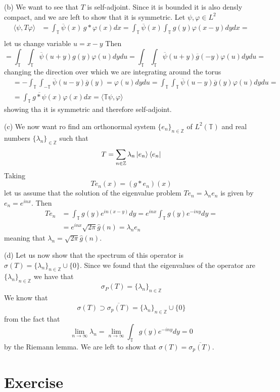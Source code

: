 \documentclass{article}
\newcommand{\T}{\mathbb{T}}
\newcommand{\Z}{\mathbb{Z}}
\begin{document}
(b) We want to see that $T$ is self-adjoint. Since it is bounded it is also densly compact, and we are left to show that it is symmetric. Let $\psi, \varphi \in L^2$
\[
    \begin{split}
        \langle \psi, T \varphi \rangle &= \int_\T \overline{\psi} (x)\, g*\varphi (x) dx = \int_\T \overline{\psi} (x) \int_\T g(y) \varphi(x-y)dy dx = \\
    \end{split}
\]
let us change variable $u = x-y$ Then
\[
    = \int_\T \int_\T \overline{\psi}(u+y) g(y) \varphi (u) dy du = \int_\T \int_\T \overline{\psi}(u+y) \overline{g}(-y) \varphi (u) dy du = 
\]
changing the direction over which we are integrating around the torus 
\[
    \begin{split}
        &= - \int_\T \int_{-\T} \overline{\psi}(u-y) \overline{g}(y) = \varphi (u) dy du = \int_\T \int_\T \overline{\psi}(u-y) \overline{g}(y) \varphi (u) dy du = \\
        &= \int_\T \overline{g *\psi}(x) \varphi (x) dx = \langle \T \psi, \varphi \rangle
    \end{split}
\]
showing tha it is symmetric and therefore self-adjoint.

(c) We now want ro find am orthonormal system ${\{ e_n \}}_{n \in \Z}$ of $L^2(\T)$ and real numbers ${\{ \lambda_n \}}_{\in \Z}$ such that
\[
    T = \sum_{n \in \Z} \lambda_n \ket{e_n}\bra{e_n}
\]
Taking 
\[
    T e_n (x)= (g * e_n) (x)
\]
let us assume that the solution of the eigenvalue problem $T e_n = \lambda_n e_n$ is given by $e_n = e^{inx}$. Then
\[
    \begin{split}
        T e_n & = \int_\T g(y) e^{in(x-y)} dy = e^{inx} \int_\T g(y) e^{-iny} dy = \\
        &= e^{inx} \sqrt{2\pi} \hat g(n) = \lambda_n e_n
    \end{split}
\]
meaning that $\lambda_n = \sqrt{2\pi} \hat g(n)$.

(d) Let us now show that the spectrum of this operator is $\sigma(T) = {\{ \lambda_n \}}_{n \in \Z} \cup \{ 0 \}$. Since we found that the eigenvalues of the operator are ${\{ \lambda_n \}}_{n\in \Z}$ we have that 
\[
    \sigma_P (T)= {\{ \lambda_n \}}_{n\in \Z}
\]
We know that 
\[
    \sigma(T) \supset \overline{\sigma_p (T)} = {\{ \lambda_n \}}_{n\in \Z} \cup \{ 0 \}
\]
from the fact that 
\[
    \lim_{n \to \infty} \lambda_n = \lim_{n \to \infty} \int_\T g(y) e^{-iny} dy = 0
\]
by the Riemann lemma. We are left to show that $\sigma(T) = \overline{\sigma_p (T)}$.
\section{Exercise}
\end{document}

